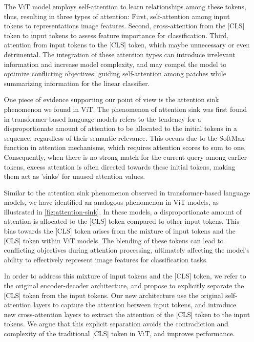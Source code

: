 The ViT model employs self-attention to learn relationships among these tokens, thus, resulting in three types of attention:
First, self-attention among input tokens to representations image features. Second, cross-attention from the [CLS] token to input tokens to assess feature importance for classification. Third, attention from input tokens to the [CLS] token, which maybe unnecessary or even detrimental.
The integration of these attention types can introduce irrelevant information and increase model complexity, and may compel the model to optimize conflicting objectives: guiding self-attention among patches while summarizing information for the linear classifier.

One piece of evidence supporting our point of view is the attention sink phenomenon we found in ViT.
The phenomenon of attention sink was first found in transformer-based language models \cite{xiaoefficient} refers to the tendency for a disproportionate amount of attention to be allocated to the initial tokens in a sequence, regardless of their semantic relevance.
This occurs due to the SoftMax function in attention mechanisms, which requires attention scores to sum to one.
Consequently, when there is no strong match for the current query among earlier tokens, excess attention is often directed towards these initial tokens, making them act as 'sinks' for unused attention values.

Similar to the attention sink phenomenon observed in transformer-based language models, we have identified an analogous phenomenon in ViT models, as illustrated in \cref{fig:attention-sink}. In these models, a disproportionate amount of attention is allocated to the [CLS] token compared to other input tokens.
This bias towards the [CLS] token arises from the mixture of input tokens and the [CLS] token within ViT models.
The blending of these tokens can lead to conflicting objectives during attention processing, ultimately affecting the model's ability to effectively represent image features for classification tasks. 

In order to address this mixture of input tokens and the [CLS] token, we refer to the original encoder-decoder architecture, and propose to explicitly separate the [CLS] token from the input tokens.
Our new architecture use the original self-attention layers to capture the attention between input tokens, and introduce new cross-attention layers to extract the attention of the [CLS] token to the input tokens.
We argue that this explicit separation avoids the contradiction and complexity of the traditional [CLS] token in ViT, and improves performance.


